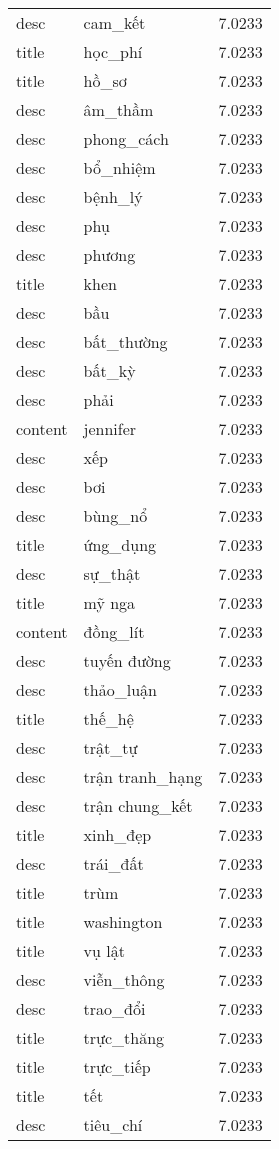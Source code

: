 \documentclass{article}
\begin{document}
\begin{tabular}{lll}
desc & cam\_kết & 7.0233\\
title & học\_phí & 7.0233\\
title & hồ\_sơ & 7.0233\\
desc & âm\_thầm & 7.0233\\
desc & phong\_cách & 7.0233\\
desc & bổ\_nhiệm & 7.0233\\
desc & bệnh\_lý & 7.0233\\
desc & phụ & 7.0233\\
desc & phương & 7.0233\\
title & khen & 7.0233\\
desc & bầu & 7.0233\\
desc & bất\_thường & 7.0233\\
desc & bất\_kỳ & 7.0233\\
desc & phải & 7.0233\\
content & jennifer & 7.0233\\
desc & xếp & 7.0233\\
desc & bơi & 7.0233\\
desc & bùng\_nổ & 7.0233\\
title & ứng\_dụng & 7.0233\\
desc & sự\_thật & 7.0233\\
title & mỹ nga & 7.0233\\
content & đồng\_lít & 7.0233\\
desc & tuyến đường & 7.0233\\
desc & thảo\_luận & 7.0233\\
title & thế\_hệ & 7.0233\\
desc & trật\_tự & 7.0233\\
desc & trận tranh\_hạng & 7.0233\\
desc & trận chung\_kết & 7.0233\\
title & xinh\_đẹp & 7.0233\\
desc & trái\_đất & 7.0233\\
title & trùm & 7.0233\\
title & washington & 7.0233\\
title & vụ lật & 7.0233\\
desc & viễn\_thông & 7.0233\\
desc & trao\_đổi & 7.0233\\
title & trực\_thăng & 7.0233\\
title & trực\_tiếp & 7.0233\\
title & tết & 7.0233\\
desc & tiêu\_chí & 7.0233\\

\end{tabular}
\end{document}
